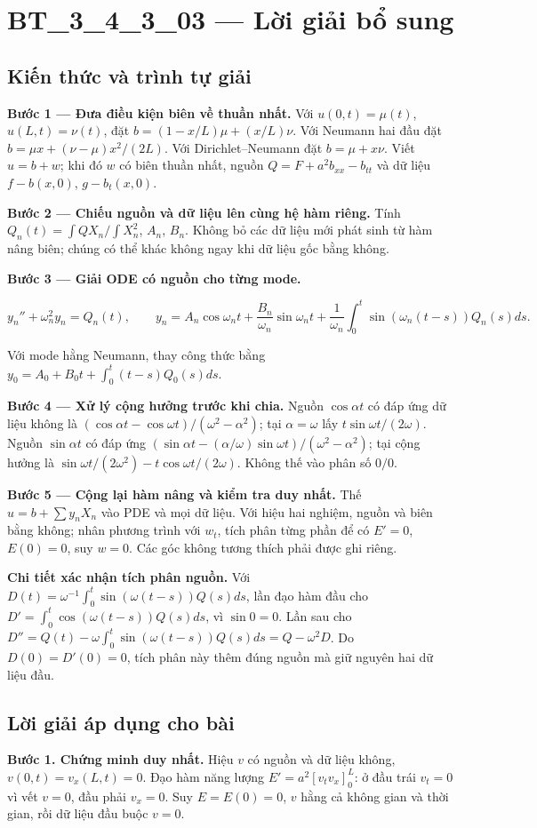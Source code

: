 \documentclass[10pt,a4paper]{article}
\begin{document}
\section*{BT\_3\_4\_3\_03 — Lời giải bổ sung}
\subsection*{Kiến thức và trình tự giải}
\textbf{Bước 1 — Đưa điều kiện biên về thuần nhất.} Với $u(0,t)=\mu(t)$, $u(L,t)=\nu(t)$, đặt $b=(1-x/L)\mu+(x/L)\nu$. Với Neumann hai đầu đặt $b=\mu x+(\nu-\mu)x^2/(2L)$. Với Dirichlet–Neumann đặt $b=\mu+x\nu$. Viết $u=b+w$; khi đó $w$ có biên thuần nhất, nguồn $Q=F+a^2b_{xx}-b_{tt}$ và dữ liệu $f-b(x,0)$, $g-b_t(x,0)$.

\textbf{Bước 2 — Chiếu nguồn và dữ liệu lên cùng hệ hàm riêng.} Tính $Q_n(t)=\int QX_n/\int X_n^2$, $A_n$, $B_n$. Không bỏ các dữ liệu mới phát sinh từ hàm nâng biên; chúng có thể khác không ngay khi dữ liệu gốc bằng không.

\textbf{Bước 3 — Giải ODE có nguồn cho từng mode.}


\[
y_n''+\omega_n^2y_n=Q_n(t),\qquad
y_n=A_n\cos\omega_nt+\frac{B_n}{\omega_n}\sin\omega_nt+\frac1{\omega_n}\int_0^t\sin(\omega_n(t-s))Q_n(s)ds.
\]


Với mode hằng Neumann, thay công thức bằng $y_0=A_0+B_0t+\int_0^t(t-s)Q_0(s)ds$.

\textbf{Bước 4 — Xử lý cộng hưởng trước khi chia.} Nguồn $\cos\alpha t$ có đáp ứng dữ liệu không là $(\cos\alpha t-\cos\omega t)/(\omega^2-\alpha^2)$; tại $\alpha=\omega$ lấy $t\sin\omega t/(2\omega)$. Nguồn $\sin\alpha t$ có đáp ứng $(\sin\alpha t-(\alpha/\omega)\sin\omega t)/(\omega^2-\alpha^2)$; tại cộng hưởng là $\sin\omega t/(2\omega^2)-t\cos\omega t/(2\omega)$. Không thế vào phân số $0/0$.

\textbf{Bước 5 — Cộng lại hàm nâng và kiểm tra duy nhất.} Thế $u=b+\sum y_nX_n$ vào PDE và mọi dữ liệu. Với hiệu hai nghiệm, nguồn và biên bằng không; nhân phương trình với $w_t$, tích phân từng phần để có $E'=0$, $E(0)=0$, suy $w=0$. Các góc không tương thích phải được ghi riêng.

\textbf{Chi tiết xác nhận tích phân nguồn.} Với $D(t)=\omega^{-1}\int_0^t\sin(\omega(t-s))Q(s)ds$, lần đạo hàm đầu cho $D'=\int_0^t\cos(\omega(t-s))Q(s)ds$, vì $\sin0=0$. Lần sau cho $D''=Q(t)-\omega\int_0^t\sin(\omega(t-s))Q(s)ds=Q-\omega^2D$. Do $D(0)=D'(0)=0$, tích phân này thêm đúng nguồn mà giữ nguyên hai dữ liệu đầu.
\subsection*{Lời giải áp dụng cho bài}
\textbf{Bước 1. Chứng minh duy nhất.} Hiệu $v$ có nguồn và dữ liệu không, $v(0,t)=v_x(L,t)=0$. Đạo hàm năng lượng $E'=a^2[v_tv_x]_0^L$: ở đầu trái $v_t=0$ vì vết $v=0$, đầu phải $v_x=0$. Suy $E=E(0)=0$, $v$ hằng cả không gian và thời gian, rồi dữ liệu đầu buộc $v=0$.
\end{document}
